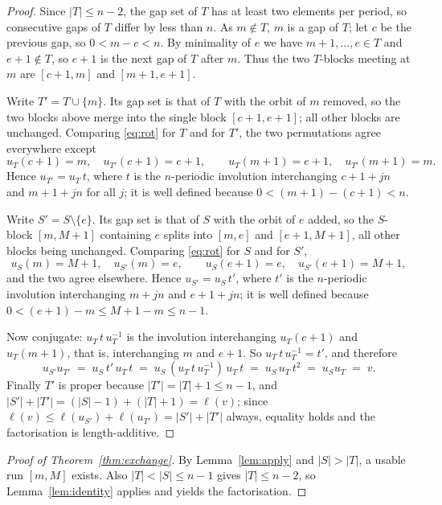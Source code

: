 \documentclass[11pt]{article}
\theoremstyle{definition}
\begin{document}
\begin{proof}
Since $|T|\le n-2$, the gap set of $T$ has at least two elements per period, so consecutive
gaps of $T$ differ by less than $n$. As $m\notin T$, $m$ is a gap of $T$; let $c$ be the
previous gap, so $0<m-c<n$. By minimality of $e$ we have $m+1,\dots,e\in T$ and $e+1\notin T$,
so $e+1$ is the next gap of $T$ after $m$. Thus the two $T$-blocks meeting at $m$ are
$[c+1,m]$ and $[m+1,e+1]$.

Write $T'=T\cup\{m\}$. Its gap set is that of $T$ with the orbit of $m$ removed, so the two
blocks above merge into the single block $[c+1,e+1]$; all other blocks are unchanged. Comparing
\eqref{eq:rot} for $T$ and for $T'$, the two permutations agree everywhere except
\[
  u_T(c+1)=m,\quad u_{T'}(c+1)=e+1,\qquad u_T(m+1)=e+1,\quad u_{T'}(m+1)=m .
\]
Hence $u_{T'}=u_T\,t$, where $t$ is the $n$-periodic involution interchanging $c+1+jn$ and
$m+1+jn$ for all $j$; it is well defined because $0<(m+1)-(c+1)<n$.

Write $S'=S\setminus\{e\}$. Its gap set is that of $S$ with the orbit of $e$ added, so the
$S$-block $[m,M+1]$ containing $e$ splits into $[m,e]$ and $[e+1,M+1]$, all other blocks being
unchanged. Comparing \eqref{eq:rot} for $S$ and for $S'$,
\[
  u_S(m)=M+1,\quad u_{S'}(m)=e,\qquad u_S(e+1)=e,\quad u_{S'}(e+1)=M+1,
\]
and the two agree elsewhere. Hence $u_{S'}=u_S\,t'$, where $t'$ is the $n$-periodic involution
interchanging $m+jn$ and $e+1+jn$; it is well defined because $0<(e+1)-m\le M+1-m\le n-1$.

Now conjugate: $u_T\,t\,u_T^{-1}$ is the involution interchanging $u_T(c+1)$ and $u_T(m+1)$,
that is, interchanging $m$ and $e+1$. So $u_T\,t\,u_T^{-1}=t'$, and therefore
\[
  u_{S'}u_{T'}\;=\;u_S\,t'\,u_T\,t\;=\;u_S\,(u_T\,t\,u_T^{-1})\,u_T\,t\;=\;u_S\,u_T\,t^2\;=\;u_Su_T\;=\;v .
\]
Finally $T'$ is proper because $|T'|=|T|+1\le n-1$, and
$|S'|+|T'|=(|S|-1)+(|T|+1)=\ell(v)$; since $\ell(v)\le\ell(u_{S'})+\ell(u_{T'})=|S'|+|T'|$
always, equality holds and the factorisation is length-additive.
\end{proof}

\begin{proof}[Proof of Theorem~\ref{thm:exchange}]
By Lemma~\ref{lem:apply} and $|S|>|T|$, a usable run $[m,M]$ exists. Also
$|T|<|S|\le n-1$ gives $|T|\le n-2$, so Lemma~\ref{lem:identity} applies and yields the
factorisation.
\end{proof}
\end{document}
